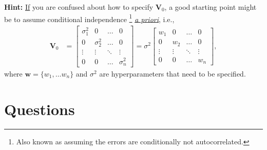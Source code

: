 \documentclass[a4paper,10pt, notitlepage]{report}
\begin{document}
\textbf{Hint:} \underline{If} you are confused about how to specify $\boldsymbol{V}_0$, a good starting point might be to assume conditional independence \footnote{Also known as assuming the errors are conditionally not autocorrelated.} \underline{\textit{ a priori}}, i.e.,
\begin{align*}
               \boldsymbol{V}_0
    &=  \begin{bmatrix}
   \sigma^2_{1} & 0& \ldots & 0\\ 
   0 & \sigma^2_{2} & \ldots &0\\ 
   \vdots & \vdots &  \ddots & \vdots \\ 
   0&  0 &  \ldots & \sigma^2_{n}
 \end{bmatrix} = \sigma^2 \begin{bmatrix}
   w_{1} & 0& \ldots & 0\\ 
   0 & w_{2} & \ldots &0\\ 
   \vdots & \vdots &  \ddots & \vdots \\ 
   0&  0 &  \ldots & w_{n}
 \end{bmatrix},
\end{align*}
where $\boldsymbol{w} = \{w_1, \ldots w_n\}$ and $\sigma^2$ are hyperparameters that need to be specified. 
\section*{Questions}
\end{document}
